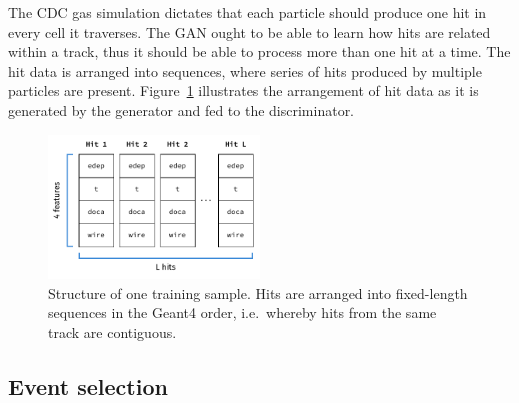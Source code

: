 The CDC gas simulation dictates that each particle should produce one hit in
every cell it traverses. The GAN ought to be able to learn how hits are related
within a track, thus it should be able to process more than one hit at a time.
The hit data is arranged into sequences, where series of hits produced by
multiple particles are present. Figure~\ref{fig:hit_data_structure} illustrates
the arrangement of hit data as it is generated by the generator and fed to the
discriminator.

\begin{figure}
    \centering
    \includegraphics[width=0.5\textwidth]{chapter4/hit_sequence.drawio.pdf}
    \caption{Structure of one training sample. Hits are arranged into
    fixed-length sequences in the {\sc Geant4} order, i.e.\ whereby hits from
    the same track are contiguous.}
    \label{fig:hit_data_structure}
\end{figure}



\subsection{Event selection}



